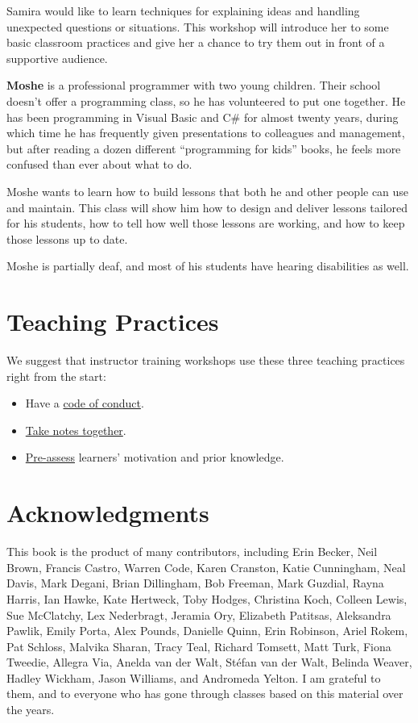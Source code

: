 \documentclass[10pt,statementpaper]{memoir}
\begin{document}
Samira would like to learn techniques for explaining ideas and handling
unexpected questions or situations. This workshop will introduce her to
some basic classroom practices and give her a chance to try them out in
front of a supportive audience.

\textbf{Moshe} is a professional programmer with two young children.
Their school doesn't offer a programming class, so he has volunteered to
put one together. He has been programming in Visual Basic and C\# for
almost twenty years, during which time he has frequently given
presentations to colleagues and management, but after reading a dozen
different ``programming for kids'' books, he feels more confused than
ever about what to do.

Moshe wants to learn how to build lessons that both he and other people
can use and maintain. This class will show him how to design and deliver
lessons tailored for his students, how to tell how well those lessons
are working, and how to keep those lessons up to date.

Moshe is partially deaf, and most of his students have hearing
disabilities as well.

\section{Teaching Practices}\label{teaching-practices}

We suggest that instructor training workshops use these three teaching
practices right from the start:

\begin{itemize}
\item
  Have a \href{practices.html\#code-of-conduct}{code of conduct}.
\item
  \href{practices.html\#take-notes-together}{Take notes together}.
\item
  \href{practices.html\#assess-motivation-and-prior-knowledge}{Pre-assess}
  learners' motivation and prior knowledge.
\end{itemize}

\section{Acknowledgments}\label{acknowledgments}

This book is the product of many contributors, including Erin Becker,
Neil Brown, Francis Castro, Warren Code, Karen Cranston, Katie
Cunningham, Neal Davis, Mark Degani, Brian Dillingham, Bob Freeman, Mark
Guzdial, Rayna Harris, Ian Hawke, Kate Hertweck, Toby Hodges, Christina
Koch, Colleen Lewis, Sue McClatchy, Lex Nederbragt, Jeramia Ory,
Elizabeth Patitsas, Aleksandra Pawlik, Emily Porta, Alex Pounds,
Danielle Quinn, Erin Robinson, Ariel Rokem, Pat Schloss, Malvika Sharan,
Tracy Teal, Richard Tomsett, Matt Turk, Fiona Tweedie, Allegra Via,
Anelda van der Walt, Stéfan van der Walt, Belinda Weaver, Hadley
Wickham, Jason Williams, and Andromeda Yelton. I am grateful to them,
and to everyone who has gone through classes based on this material over
the years.
\end{document}
